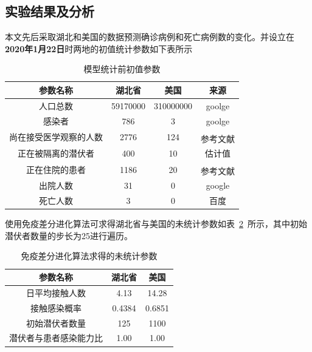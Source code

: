 \documentclass{whutmod}
\newcommand{\upcite}[1]{\textsuperscript{\cite{#1}}}
\begin{document}
		
        \subsection{实验结果及分析}
        本文先后采取湖北和美国的数据预测确诊病例和死亡病例数的变化。并设立在\textbf{2020年1月22日}时两地的初值统计参数如下表所示
                	\begin{table}[H]
        	\centering		
        	\caption{模型统计前初值参数}\label{sdsssf}
        	\begin{tabular}{cccc}
        		\toprule[2pt]
        		\multicolumn{1}{m{4cm}}{\centering 参数名称}
        		& \multicolumn{1}{m{3cm}}{\centering 湖北省}
        		& \multicolumn{1}{m{3cm}}{\centering 美国}
        		& \multicolumn{1}{m{3cm}}{\centering 来源}
        		\\
        		\midrule[1pt]
        		人口总数&  59170000& 310000000&goolge\\ 
        		感染者&   786& 3&goolge\\ 
        		尚在接受医学观察的人数&  2776& 124&参考文献\upcite{2}\\ 
        		正在被隔离的潜伏者&  400& 10&估计值\\ 
        		 正在住院的患者&  1186& 20&参考文献\upcite{2}\\ 
        		 出院人数&  31& 0&google\\ 
        		死亡人数&  3& 0&百度\\ 
        		\bottomrule[2pt]	
        	\end{tabular}
        \end{table}
        
        使用免疫差分进化算法可求得湖北省与美国的未统计参数如表~\ref{sdf}~所示，其中初始潜伏者数量的步长为25进行遍历。
        
        	\begin{table}[H]
        	\centering		
        	\caption{免疫差分进化算法求得的未统计参数}\label{sdf}
        	\begin{tabular}{ccc}
        		\toprule[2pt]
        		\multicolumn{1}{m{5cm}}{\centering 参数名称}
        		& \multicolumn{1}{m{4cm}}{\centering 湖北省}
        		& \multicolumn{1}{m{4cm}}{\centering 美国}
        		\\
        		\midrule[1pt]
        	日平均接触人数&   4.13& 14.28\\ 
        	接触感染概率& 0.4384	& 0.6851\\ 
        	初始潜伏者数量& 	125& 1100\\ 
        	潜伏者与患者感染能力比& 1.00&1.00\\
        		\bottomrule[2pt]	
        	\end{tabular}
		\end{table}
        
\end{document}
